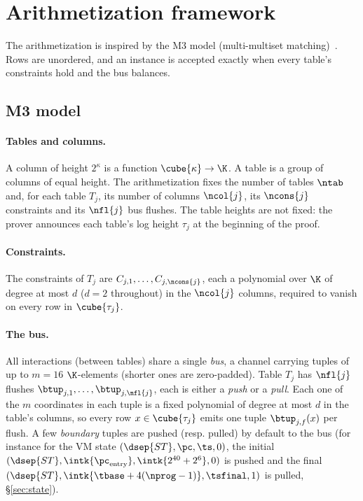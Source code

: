 \section{Arithmetization framework}\label{sec:arith}

The arithmetization is inspired by the M3 model (multi-multiset matching)~\cite{m3}. Rows are unordered, and an instance is accepted exactly when every table's constraints hold and the bus balances.

\subsection{M3 model}\label{sec:m3}

\paragraph{Tables and columns.} A column of height $2^{\kappa}$ is a function $\cube{\kappa}\to\K$. A table is a group of columns of equal height. The arithmetization fixes the number of tables $\ntab$ and, for each table $T_j$, its number of columns $\ncol{j}$, its $\ncons{j}$ constraints and its $\nfl{j}$ bus flushes. The table heights are not fixed: the prover announces each table's log height $\tau_j$ at the beginning of the proof.

\paragraph{Constraints.} The constraints of $T_j$ are $C_{j,1},\dots,C_{j,\ncons{j}}$, each a polynomial over $\K$ of degree at most $d$ ($d=2$ throughout) in the $\ncol{j}$ columns, required to vanish on every row in $\cube{\tau_j}$.

\paragraph{The bus.} All interactions (between tables) share a single \emph{bus}, a channel carrying tuples of up to $m=16$ $\K$-elements (shorter ones are zero-padded). Table $T_j$ has $\nfl{j}$ flushes $\btup_{j,1},\dots,\btup_{j,\nfl{j}}$, each is either a \emph{push} or a \emph{pull}. Each one of the $m$ coordinates in each tuple is a fixed polynomial of degree at most $d$ in the table's columns, so every row $x\in\cube{\tau_j}$ emits one tuple $\btup_{j,f}(x)$ per flush. A few \emph{boundary} tuples are pushed (resp. pulled) by default to the bus (for instance for the VM state $(\dsep{ST}, \pc, \ts,0)$, the initial $(\dsep{ST}, \intk{\pc_{\mathrm{entry}}}, \intk{2^{40}+2^{6}},0)$ is pushed and the final $(\dsep{ST}, \intk{\tbase+4(\nprog-1)}, \tsfinal,1)$ is pulled, \S\ref{sec:state}).

